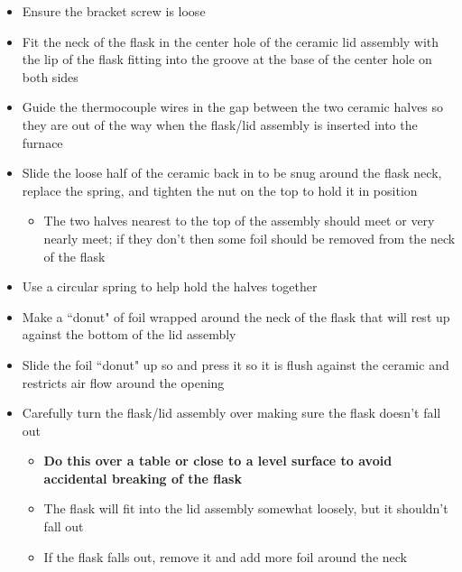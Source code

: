 \documentclass[letterpaper,11pt]{article}
\begin{document}
\begin{itemize}
\begin{itemize}
        \item Ensure the bracket screw is loose
        \item Fit the neck of the flask in the center hole of the ceramic lid 
            assembly with the lip of the flask fitting into the groove at the 
            base of the center hole on both sides
        \item Guide the thermocouple wires in the gap between the two ceramic 
            halves so they are out of the way when the flask/lid assembly is 
            inserted into the furnace
        \item Slide the loose half of the ceramic back in to be snug 
            around the flask neck, replace the spring, and tighten the nut on the top to hold it
            in position
                \begin{itemize}
                \item The two halves nearest to the top of the assembly should 
                    meet or very nearly meet; if they don't then some 
                    foil should be removed from the neck of the flask
                 \end{itemize}
        \item Use a circular spring to help hold the halves together
               
        
        \item Make a ``donut" of foil wrapped around the neck of the flask that 
            will rest up against the bottom of the lid assembly
        \item Slide the foil ``donut" up so and press it so it is flush against 
            the ceramic and restricts air flow around the opening
        \item Carefully turn the flask/lid assembly over making sure the flask 
            doesn't fall out
                \begin{itemize}
                \item \textbf{Do this over a table or close to a level surface 
                    to avoid accidental breaking of the flask}
                \item The flask will fit into the lid assembly somewhat loosely, 
                    but it shouldn't fall out
                \item If the flask falls out, remove it and add more foil 
                around the neck
                \end{itemize}
         

\end{itemize}
\end{itemize}
\end{document}
